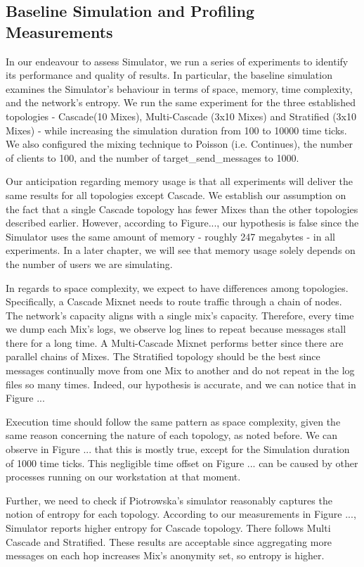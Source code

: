 \documentclass[logo,msc,cyber]{infthesis}   %
\begin{document}
\subsection{Baseline Simulation and Profiling Measurements}

In our endeavour to assess Simulator, we run a series of experiments to identify
its performance and quality of results. In particular, the baseline simulation
examines the Simulator's behaviour in terms of space, memory, time complexity,
and the network's entropy. We run the same experiment for the three established
topologies - Cascade(10 Mixes), Multi-Cascade (3x10 Mixes) and Stratified (3x10
Mixes) - while increasing the simulation duration from 100 to 10000 time ticks.
We also configured the mixing technique to Poisson (i.e. Continues), the number
of clients to 100, and the number of target\_send\_messages to 1000. 

Our anticipation regarding memory usage is that all experiments will deliver the
same results for all topologies except Cascade. We establish our assumption on
the fact that a single Cascade topology has fewer Mixes than the other
topologies described earlier. However, according to Figure..., our hypothesis is
false since the Simulator uses the same amount of memory - roughly 247 megabytes
- in all experiments. In a later chapter, we will see that
memory usage solely depends on the number of users we are simulating.

In regards to space complexity, we expect to have differences among topologies.
Specifically, a Cascade Mixnet needs to route traffic through a chain of
nodes. The network's capacity aligns with a single mix's capacity. Therefore,
every time we dump each Mix's logs, we observe log lines to repeat because
messages stall there for a long time. A Multi-Cascade Mixnet performs better
since there are parallel chains of Mixes. The Stratified topology should be the
best since messages continually move from one Mix to another and do not repeat
in the log files so many times. Indeed, our hypothesis is accurate, and we can
notice that in Figure ...

Execution time should follow the same pattern as space complexity, given the
same reason concerning the nature of each topology, as noted before. We can
observe in Figure ... that this is mostly true, except for the Simulation
duration of 1000 time ticks. This negligible time offset on Figure ...  can be
caused by other processes running on our workstation at that moment.

Further, we need to check if Piotrowska's simulator reasonably captures the
notion of entropy for each topology. According to our measurements in Figure
..., Simulator reports higher entropy for Cascade topology. There follows Multi
Cascade and Stratified. These results are acceptable since aggregating more
messages on each hop increases Mix's anonymity set, so entropy is higher.
\end{document}
